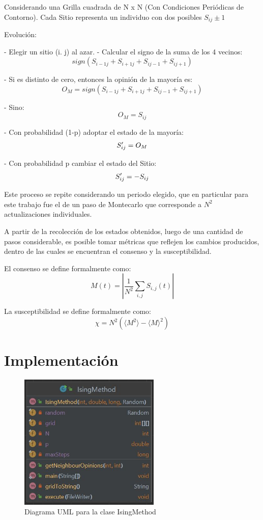 \documentclass[12pt]{article}
\begin{document}
Considerando una Grilla cuadrada de N x N (Con Condiciones Periódicas de Contorno).
Cada Sitio representa un individuo con dos posibles $S_{ij}\pm1$

Evolución:

- Elegir un sitio (i. j) al azar.
- Calcular el signo de la suma de los 4 vecinos: $$sign(S_{i-1 j}\!+\!S_{i+1j}\!+\!S_{i j-1}\!+\!S_{i j+1})$$

    - Si es distinto de cero, entonces la opinión de la mayoría es:
$$O_{M}=sign(S_{i-1 j}\!+\!S_{i+1j}\!+\!S_{i j-1}\!+\!S_{i j+1})$$

    - Sino:
$$O_{M}=S_{ij}$$

- Con probabilidad (1-p) adoptar el estado de la mayoría: $$S\space^\prime_{ij}=O_{M}$$

- Con probabilidad p cambiar el estado del Sitio: $$S\space^\prime_{ij}=-S_{ij}$$


Este proceso se repite considerando un periodo elegido, que en particular para este trabajo fue el de un paso de Montecarlo que corresponde a $N^{2}$ actualizaciones individuales.

A partir de la recolección de los estados obtenidos, luego de una cantidad de pasos considerable, es posible tomar métricas que reflejen los cambios producidos, dentro de las cuales se encuentran el consenso y la susceptibilidad.

El consenso se define formalmente como:
    $$M(t)=|{\frac{1}{N^{2}}}\sum_{i,j}S_{i,j}(t)|$$

La susceptibilidad se define formalmente como:
    $$\chi=N^{2}\left(\langle M^{2}\rangle-\langle M\rangle^{2}\right)$$

\section{Implementación}
\begin{figure}[h]
    \centering
    \includegraphics[width=0.6\textwidth]{uml_ising_method.JPG} 
    \caption{Diagrama UML para la clase IsingMethod}
    \label{fig:example}
\end{figure}
\end{document}
